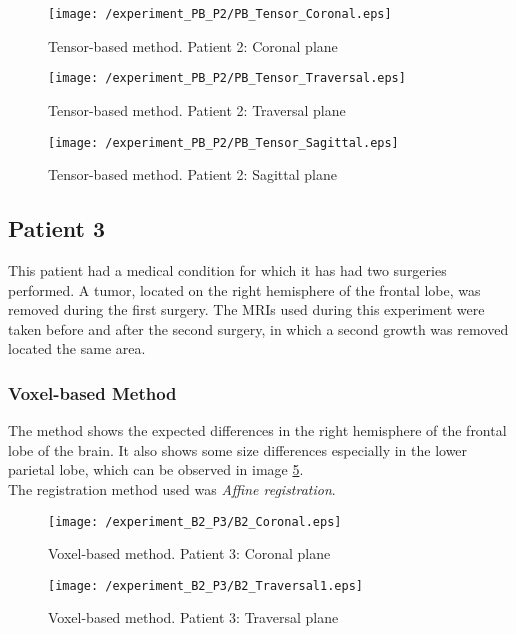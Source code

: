 \begin{figure}[H]
  \centering
  \texttt{[image: /experiment\_PB\_P2/PB\_Tensor\_Coronal.eps]}
  \caption{Tensor-based method. Patient 2: Coronal plane}
  \label{PB_TCoronal}
\end{figure}

\begin{figure}[H]
  \centering
  \texttt{[image: /experiment\_PB\_P2/PB\_Tensor\_Traversal.eps]}
  \caption{Tensor-based method. Patient 2: Traversal plane}
  \label{PB_TTraversal}
\end{figure}

\begin{figure}[H]
  \centering
  \texttt{[image: /experiment\_PB\_P2/PB\_Tensor\_Sagittal.eps]}
  \caption{Tensor-based method. Patient 2: Sagittal plane}
  \label{PB_TSagittal}
\end{figure}


\subsection{Patient 3}
This patient had a medical condition for which it has had two
surgeries performed. A tumor, located on the right hemisphere of the
frontal lobe, was removed during the first surgery. The MRIs used
during this experiment were taken before and after the second surgery,
in which a second growth was removed located the same area.


\subsubsection{Voxel-based Method}
The method shows the expected differences in the right hemisphere of
the frontal lobe of the brain. It also shows some size differences
especially in the lower parietal lobe, which can be observed in image
\ref{B2_Traversal1}.\\

The registration method used was \textit{Affine registration}.

\begin{figure}[H]
  \centering
  \texttt{[image: /experiment\_B2\_P3/B2\_Coronal.eps]}
  \caption{Voxel-based method. Patient 3: Coronal plane}
  \label{B2_Coronal}
\end{figure}

\begin{figure}[H]
  \centering
  \texttt{[image: /experiment\_B2\_P3/B2\_Traversal1.eps]}
  \caption{Voxel-based method. Patient 3: Traversal plane}
  \label{B2_Traversal1}
\end{figure}

